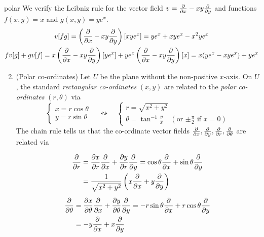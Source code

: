 \begin{examples}{}{polar}
	\exstart We verify the Leibniz rule for the vector field $v=\partials x-xy\partials y$ and functions $f(x,y)=x$ and $g(x,y)=ye^x$.
	\begin{gather*}
		v[fg]=\left(\partials x-xy\partials y\right)[xye^x] =ye^x+xye^x-x^2ye^x\\
		fv[g]+gv[f]=x\left(\partials x-xy\partials y\right)[ye^x] +ye^x\left(\partials x-xy\partials y\right)[x] =x(ye^x-xye^x) +ye^x
	\end{gather*}

\begin{enumerate}\setcounter{enumi}{1}
  \item\label{ex:polar2} (Polar co-ordinates) 
	Let $U$ be the plane without the non-positive $x$-axis. On $U$, the standard \emph{rectangular co-ordinates} $(x,y)$ are related to the \emph{polar co-ordinates} $(r,\theta)$ via
	\[
		\begin{cases}
			x=r\cos\theta\\
			y=r\sin\theta
		\end{cases}
		\quad\leftrightsquigarrow\quad
		\begin{cases}
			r=\sqrt{x^2+y^2}\\
			\theta=\tan^{-1}\frac yx\quad (\text{or $\pm\frac\pi 2$ if $x=0$})
		\end{cases}
	\]
	The chain rule tells us that the co-ordinate vector fields $\partials x,\partials y,\partials r,\partials\theta$ are related via\par
	\begin{minipage}[t]{0.59\linewidth}\vspace{-10pt}
		\begin{gather*}
			\begin{aligned}
				\partials r&=\partials[x]{r}\partials x+\partials[y]{r}\partials{y} =\cos\theta\partials x+\sin\theta\partials y\\
				&=\frac 1{\sqrt{x^2+y^2}}\left(x\partials x+y\partials y\right)
			\end{aligned}
			\\[5pt]
			\begin{aligned}
				\partials\theta&=\partials[x]{\theta}\partials x+\partials[y]{\theta}\partials{y} =-r\sin\theta\partials x+r\cos\theta\partials y\\
				&=-y\partials x+x\partials y
			\end{aligned}
		\end{gather*}
	\end{minipage}

\end{enumerate}
\end{examples}
